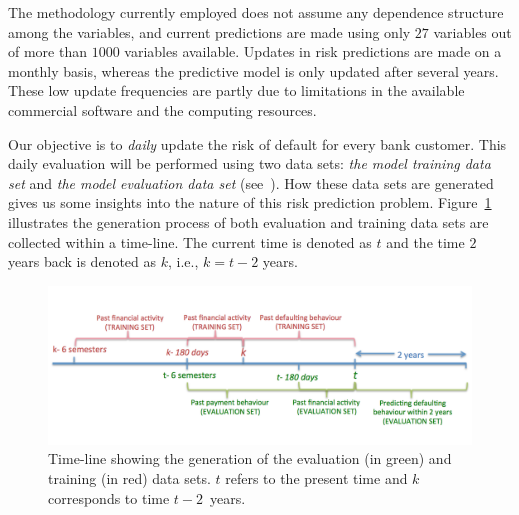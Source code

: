 The methodology currently employed does not assume any dependence structure among the variables, and current predictions are made using only $27$ variables out of more than $1000$ variables available. Updates in risk predictions are made on a monthly basis, whereas the predictive model is only updated after several years. These low update frequencies are partly due to limitations in the available commercial software and the computing resources.

Our objective is to \textit{daily} update the risk of default for every bank customer. This daily evaluation will be performed using two data sets: \textit{the model training data set} and \textit{the model evaluation data set} (see~\cite{Fer14b}). How these data sets are generated gives us some insights into the nature of this risk prediction problem. Figure~\ref{Figure:CajaMarTimeLine} illustrates the generation process of both evaluation and training data sets are collected within a time-line. The current time is denoted as $t$ and the time $2$ years back is denoted as $k$, i.e., $k=t-2$ years. 

\begin{figure}[htbp]
\centering
\includegraphics[scale=0.65]{figures/CajaMarTimeLine}
\caption{\label{Figure:CajaMarTimeLine}Time-line showing the generation of the evaluation (in green) and training (in red) data sets. $t$ refers to the present time and $k$ corresponds to time $t-2$\ years.}

\end{figure}

